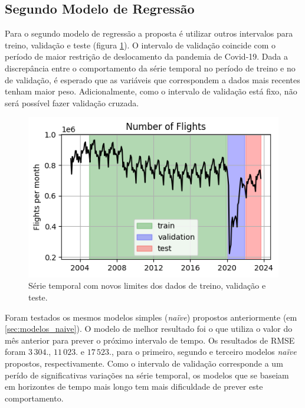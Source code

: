 \documentclass[final,5p]{elsarticle}
\numberwithin{equation}{section}
\begin{document}
        \subsection{Segundo Modelo de Regressão}

        Para o segundo modelo de regressão a proposta é utilizar outros intervalos para treino, validação e teste (figura \ref{fig:treino_teste_modelo_dois}). O intervalo de validação coincide com o período de maior restrição de deslocamento da pandemia de Covid-19. Dada a discrepância entre o comportamento da série temporal no período de treino e no de validação, é esperado que as variáveis que correspondem a dados mais recentes tenham maior peso. Adicionalmente, como o intervalo de validação está fixo, não será possível fazer validação cruzada.

        \begin{figure}[hbt!]
            \includegraphics[width=0.95\columnwidth]{C1_TrainTest.png}
            \caption{Série temporal com novos limites dos dados de treino, validação e teste.}
            \label{fig:treino_teste_modelo_dois}
        \end{figure}

        Foram testados os mesmos modelos simples (\emph{naïve}) propostos anteriormente (em \ref{sec:modelos_naive}). O modelo de melhor resultado foi o que utiliza o valor do mês anterior para prever o próximo intervalo de tempo. Os resultados de RMSE foram $3\,304.$, $11\,023.$ e $17\,523.$, para o primeiro, segundo e terceiro modelos \emph{naïve} propostos, respectivamente. Como o intervalo de validação corresponde a um perído de significativas variações na série temporal, os modelos que se baseiam em horizontes de tempo mais longo tem mais dificuldade de prever este comportamento.
\end{document}
